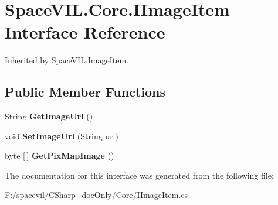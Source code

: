 \hypertarget{interface_space_v_i_l_1_1_core_1_1_i_image_item}{}\section{Space\+V\+I\+L.\+Core.\+I\+Image\+Item Interface Reference}
\label{interface_space_v_i_l_1_1_core_1_1_i_image_item}


Inherited by \mbox{\hyperlink{class_space_v_i_l_1_1_image_item}{Space\+V\+I\+L.\+Image\+Item}}.

\subsection*{Public Member Functions}
\begin{DoxyCompactItemize}
\item 
\mbox{\label{interface_space_v_i_l_1_1_core_1_1_i_image_item_ac4ff6be78c3285fd28b4b80549371a9d}} 
String {\bfseries Get\+Image\+Url} ()
\item 
\mbox{\label{interface_space_v_i_l_1_1_core_1_1_i_image_item_acd75a2df3853a0ab6b832e6c4f0b0527}} 
void {\bfseries Set\+Image\+Url} (String url)
\item 
\mbox{\label{interface_space_v_i_l_1_1_core_1_1_i_image_item_af144d0b9a1fdf87852354120c1843ad9}} 
byte \mbox{[}$\,$\mbox{]} {\bfseries Get\+Pix\+Map\+Image} ()
\end{DoxyCompactItemize}


The documentation for this interface was generated from the following file\+:\begin{DoxyCompactItemize}
\item 
F\+:/spacevil/\+C\+Sharp\+\_\+doc\+Only/\+Core/I\+Image\+Item.\+cs\end{DoxyCompactItemize}
